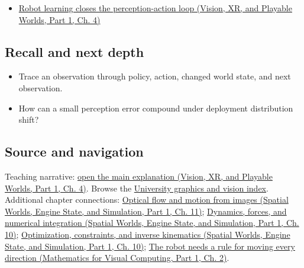 \hypertarget{appendix-b0c42da325f1-full-teaching-explanation}{}

\begin{itemize}
\tightlist
\item
  \href{../07-Vision-XR-and-Playable-Worlds-P01/main.pdf\#nameddest=04-visual-computing-ii-ch034-robot-learning-closes-the-perception-action-loop}{Robot learning closes the perception-action loop (Vision, XR, and Playable Worlds, Part 1, Ch. 4)}
\end{itemize}

\subsection{Recall and next depth}\label{appendix-b0c42da325f1-recall-and-next-depth}

\hypertarget{appendix-b0c42da325f1-recall-and-next-depth}{}

\begin{itemize}
\tightlist
\item
  Trace an observation through policy, action, changed world state, and next observation.
\item
  How can a small perception error compound under deployment distribution shift?
\end{itemize}

\subsection{Source and navigation}\label{appendix-b0c42da325f1-source-and-navigation}

\hypertarget{appendix-b0c42da325f1-source-and-navigation}{}

Teaching narrative: \href{../07-Vision-XR-and-Playable-Worlds-P01/main.pdf\#nameddest=04-visual-computing-ii-ch034-robot-learning-closes-the-perception-action-loop}{open the main explanation (Vision, XR, and Playable Worlds, Part 1, Ch. 4)}. Browse the \hyperref[appendix-a6d556a4ef50-university-graphics-vision-and-photography---independent-series]{University graphics and vision index}. Additional chapter connections: \href{../05-Spatial-Worlds-Engine-State-and-Simulation-P01/main.pdf\#nameddest=04-visual-computing-ii-ch030-optical-flow-and-motion-from-images}{Optical flow and motion from images (Spatial Worlds, Engine State, and Simulation, Part 1, Ch. 11)}; \href{../05-Spatial-Worlds-Engine-State-and-Simulation-P01/main.pdf\#nameddest=04-visual-computing-ii-ch029-dynamics-forces-and-numerical-integration}{Dynamics, forces, and numerical integration (Spatial Worlds, Engine State, and Simulation, Part 1, Ch. 10)}; \href{../05-Spatial-Worlds-Engine-State-and-Simulation-P01/main.pdf\#nameddest=04-visual-computing-ii-ch029-optimization-constraints-and-inverse-kinematics}{Optimization, constraints, and inverse kinematics (Spatial Worlds, Engine State, and Simulation, Part 1, Ch. 10)}; \href{../02-Mathematics-for-Visual-Computing-P01/main.pdf\#nameddest=01-foundations-i-ch018-the-robot-needs-a-rule-for-moving-every-direction}{The robot needs a rule for moving every direction (Mathematics for Visual Computing, Part 1, Ch. 2)}.

